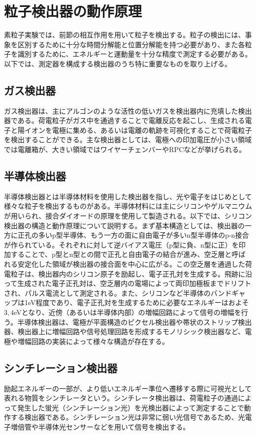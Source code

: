 \section{粒子検出器の動作原理}
 素粒子実験では、前節の相互作用を用いて粒子を検出する。粒子の検出には、事象を区別するために十分な時間分解能と位置分解能を持つ必要があり、また各粒子を識別するために、エネルギーと運動量を十分な精度で測定する必要がある。以下では、測定器を構成する検出器のうち特に重要なものを取り上げる。

\subsection{ガス検出器}
 ガス検出器は、主にアルゴンのような活性の低いガスを検出器内に充填した検出器である。荷電粒子がガス中を通過することで電離反応を起こし、生成される電子と陽イオンを電極に集める、あるいは電離の軌跡を可視化することで荷電粒子を検出することができる。主な検出器としては、電極への印加電圧が小さい領域では電離箱が、大きい領域ではワイヤーチェンバーやRPCなどが挙げられる。

\subsection{半導体検出器}
 半導体検出器とは半導体材料を使用した検出器を指し、光や電子をはじめとして様々な粒子を検出するものがある。半導体材料には主にシリコンやゲルマニウムが用いられ、接合ダイオードの原理を使用して製造される。以下では、シリコン検出器の構造と動作原理について説明する。まず基本構造としては、検出器の一方に正孔の多いp型半導体、もう一方の面に自由電子が多いn型半導体のp-n接合が作られている。それぞれに対して逆バイアス電圧（p型に負、n型に正）を印加することで、p型とn型との間で正孔と自由電子の結合が進み、空乏層と呼ばれる安定化した領域が検出器の接合面を中心に広がる。この空乏層を通過した荷電粒子は、検出器内のシリコン原子を励起し、電子正孔対を生成する。飛跡に沿って生成された電子正孔対は、空乏層内の電場によって両印加極板までドリフトされ、パルス電流として測定される。また、シリコンなど半導体のバンドギャップは1eV程度であり、電子正孔対を生成するために必要なエネルギーはおよそ$3,4$eVとなり、近傍（あるいは半導体内部）の増幅回路によって信号の増幅を行う。半導体検出器は、電極が平面構造のピクセル検出器や帯状のストリップ検出器、検出器上に増幅回路や信号処理回路を形成するモノリシック検出器など、電極や増幅回路の実装によって様々な構造が存在する。

\subsection{シンチレーション検出器}
 励起エネルギーの一部が、より低いエネルギー準位へ遷移する際に可視光として表れる物質をシンチレータという。シンチレータ検出器は、荷電粒子の通過によって発生した蛍光（シンチレーション光）を光検出器によって測定することで動作する検出器である。シンチレーション光は非常に弱い光信号であるため、光電子増倍管や半導体光センサーなどを用いて信号を検出する。
 
